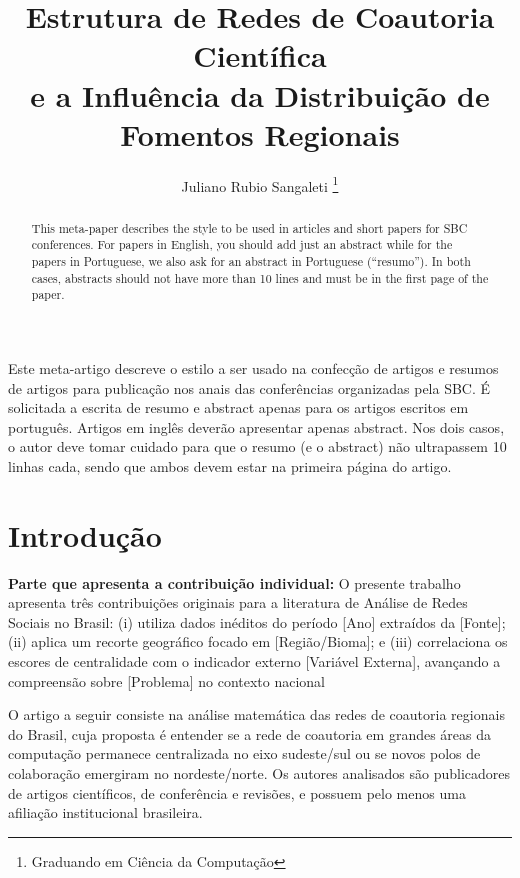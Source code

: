 \documentclass[12pt]{article}
\title{Estrutura de Redes de Coautoria Científica\\e a Influência da Distribuição de Fomentos Regionais}
\author{
	Juliano Rubio Sangaleti
		\thanks{Graduando em Ciência da Computação} \inst{1}
}
\begin{document}
 

\maketitle

\begin{abstract}
  This meta-paper describes the style to be used in articles and short papers
  for SBC conferences. For papers in English, you should add just an abstract
  while for the papers in Portuguese, we also ask for an abstract in
  Portuguese (``resumo''). In both cases, abstracts should not have more than
  10 lines and must be in the first page of the paper.
\end{abstract}
     
\begin{resumo} 
  Este meta-artigo descreve o estilo a ser usado na confecção de artigos e
  resumos de artigos para publicação nos anais das conferências organizadas
  pela SBC. É solicitada a escrita de resumo e abstract apenas para os artigos
  escritos em português. Artigos em inglês deverão apresentar apenas abstract.
  Nos dois casos, o autor deve tomar cuidado para que o resumo (e o abstract)
  não ultrapassem 10 linhas cada, sendo que ambos devem estar na primeira
  página do artigo.
\end{resumo}


\section{Introdução}
\label{sec:introducao}

\textbf{Parte que apresenta a contribuição individual:} O presente trabalho apresenta três contribuições originais para a literatura de Análise de Redes Sociais no Brasil: (i) utiliza dados inéditos do período [Ano] extraídos da [Fonte]; (ii) aplica um recorte geográfico focado em [Região/Bioma]; e (iii) correlaciona os escores de centralidade com o indicador externo [Variável Externa], avançando a compreensão sobre [Problema] no contexto nacional

O artigo a seguir consiste na análise matemática das redes de coautoria regionais do Brasil, cuja proposta é entender se a rede de coautoria em grandes áreas da computação permanece centralizada no eixo sudeste/sul ou se novos polos de colaboração emergiram no nordeste/norte. Os autores analisados são publicadores de artigos científicos, de conferência e revisões, e possuem pelo menos uma afiliação institucional brasileira.
\end{document}
